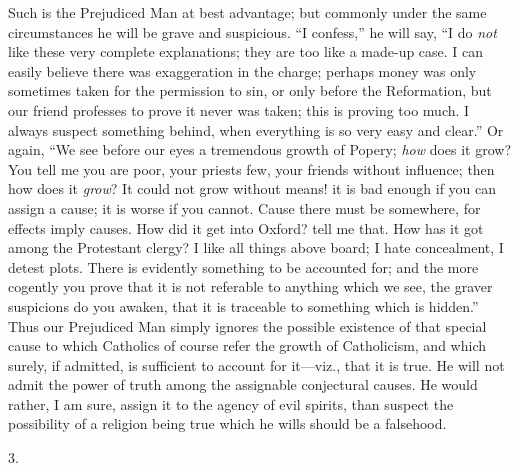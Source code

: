 Such is the Prejudiced Man at best advantage; but
commonly under the same circumstances he will be grave
and suspicious. ``I confess,'' he will say,
``I do \emph{not} like these very complete
explanations; they are too like a made-up case. I can
easily believe there was exaggeration in the charge;
perhaps money was only sometimes taken for the permission
to sin, or only before the Reformation, but our friend
professes to prove it never was taken; this is proving
too much. I always suspect something behind, when
everything is so very easy and clear.'' Or again,
``We see before our eyes a tremendous growth of
Popery; \emph{how} does it grow? You tell me you are
poor, your priests few, your friends without influence;
then how does it \emph{grow}? It could not grow without
means! it is bad enough if you can assign a cause; it is
worse if you cannot. Cause there must be somewhere, for
effects imply causes. How did it get into Oxford? tell me
that. How has it got among the Protestant clergy? I like
all things above board; I hate concealment, I detest
plots. There is evidently something to be accounted for;
and the more cogently you prove that it is not referable
to anything which we see, the graver suspicions do you
awaken, that it is traceable to something which is
hidden.'' Thus our Prejudiced Man simply ignores the
possible existence of that special cause to which
Catholics of course refer the growth of Catholicism, and
which surely, if admitted, is sufficient to account for
it—viz., that it is true. He will not admit the
power of truth among the assignable conjectural causes.
He would rather, I am sure, assign it to the agency of
evil spirits, than suspect the possibility of a religion
being true which he wills should be a falsehood.

3.

